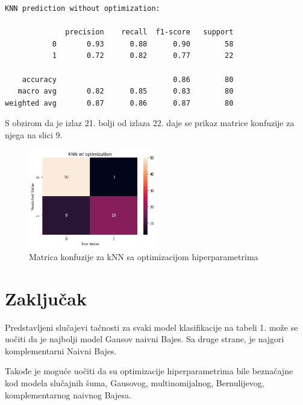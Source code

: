 \documentclass[fontsize=12bp, paper=a4]{scrarticle}
\begin{document}
\begin{lstlisting}[caption=kNN bez optimizacije hiperparametara]
KNN prediction without optimization:

              precision    recall  f1-score   support
           0       0.93      0.88      0.90        58
           1       0.72      0.82      0.77        22

    accuracy                           0.86        80
   macro avg       0.82      0.85      0.83        80
weighted avg       0.87      0.86      0.87        80
\end{lstlisting}
S obzirom da je izlaz 21. bolji od izlaza 22. daje se prikaz matrice konfuzije za njega na slici 9.

\begin{figure}[h!]
    \centering
    \includegraphics[width=0.5\textwidth]{38.png}
    \caption{Matrica konfuzije za kNN sa optimizacijom hiperparametrima}
\end{figure}

\newpage
\section{Zaključak}
Predstavljeni slučajevi tačnosti za svaki model klasifikacije na tabeli 1. može se uočiti da je najbolji model Gausov naivni Bajes. Sa druge strane, je najgori komplementarni Naivni Bajes. 

Takođe je moguće uočiti da su optimizacije hiperparametrima bile beznačajne kod modela slučajnih šuma, Gausovog, multinomijalnog, Bernulijevog, komplementarnog naivnog Bajesa.
\end{document}
